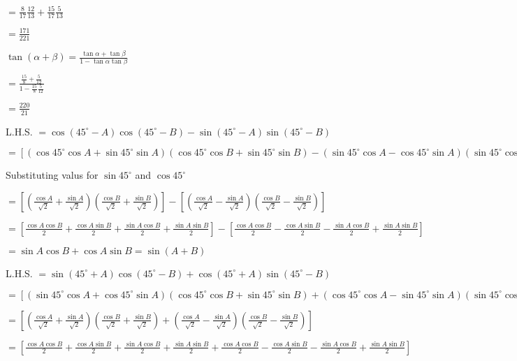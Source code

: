   $= \frac{8}{17}\frac{12}{13} + \frac{15}{17}\frac{5}{13}$

  $= \frac{171}{221}$

  $\tan(\alpha + \beta) = \frac{\tan\alpha + \tan\beta}{1 - \tan\alpha\tan\beta}$

  $= \frac{\frac{15}{8} + \frac{5}{12}}{1 - \frac{15}{8}\frac{5}{12}}$

  $= \frac{220}{21}$

\item L.H.S. $= \cos(45^{\circ} - A)\cos(45^{\circ} - B) - \sin(45^{\circ} - A)\sin(45^{\circ} - B)$

  $= [(\cos 45^\circ\cos A + \sin45^\circ\sin A)(\cos 45^\circ\cos B + \sin45^\circ\sin B) - (\sin45^\circ\cos A -
  \cos45^\circ\sin A)(\sin45^\circ\cos B - \cos45^\circ\sin B)]$

  Substituting valus for $\sin45^\circ$ and $\cos45^\circ$

  $=\left[\left(\frac{\cos A}{\sqrt{2}} + \frac{\sin A}{\sqrt{2}}\right)\left(\frac{\cos B}{\sqrt{2}} + \frac{\sin
      B}{\sqrt{2}}\right)\right] - \left[\left(\frac{\cos A}{\sqrt{2}} - \frac{\sin A}{\sqrt{2}}\right)\left(\frac{\cos B}{\sqrt{2}} -
    \frac{\sin B}{\sqrt{2}}\right)\right]$

  $= \left[\frac{\cos A\cos B}{2} + \frac{\cos A\sin B}{2} + \frac{\sin A\cos B}{2} + \frac{\sin A\sin B}{2}\right] -
  \left[\frac{\cos A\cos B}{2} - \frac{\cos A\sin B}{2} - \frac{\sin A\cos B}{2} + \frac{\sin A\sin B}{2}\right]$

  $= \sin A\cos B + \cos A\sin B = \sin(A + B)$

\item L.H.S. $= \sin(45^{\circ} + A)\cos(45^\circ - B) + \cos(45^{\circ} + A)\sin(45^\circ - B)$

  $= [(\sin45^\circ\cos A + \cos45^\circ\sin A)(\cos45^\circ\cos B + \sin45^\circ\sin B) + (\cos45^\circ\cos A -
  \sin45^\circ\sin A)(\sin45^\circ\cos B - \cos45^\circ)\sin B]$

  $= \left[\left(\frac{\cos A}{\sqrt{2}} + \frac{\sin A}{\sqrt{2}}\right)\left(\frac{\cos B}{\sqrt{2}} + \frac{\sin
    B}{\sqrt{2}}\right) + \left(\frac{\cos A}{\sqrt{2}} - \frac{\sin A}{\sqrt{2}}\right)\left(\frac{\cos B}{\sqrt{2}} - \frac{\sin
    B}{\sqrt{2}}\right)\right]$

  $= \left[\frac{\cos A\cos B}{2} + \frac{\cos A\sin B}{2} + \frac{\sin A\cos B}{2} + \frac{\sin A\sin B}{2} +
  \frac{\cos A\cos B}{2} - \frac{\cos A\sin B}{2} - \frac{\sin A\cos B}{2} + \frac{\sin A\sin B}{2}\right]$

